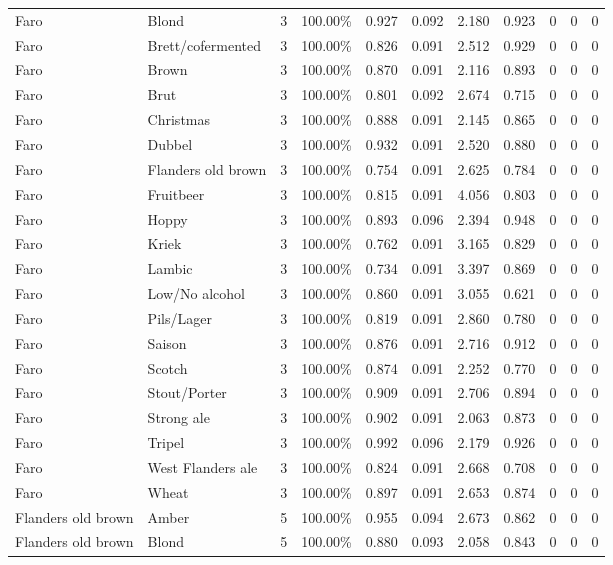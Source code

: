 {\begin{longtable}{llrrrrrrrrr}
Faro & Blond & 3 & 100.00\% & 0.927 & 0.092 & 2.180 & 0.923 & 0 & 0 & 0 \\
Faro & Brett/cofermented & 3 & 100.00\% & 0.826 & 0.091 & 2.512 & 0.929 & 0 & 0 & 0 \\
Faro & Brown & 3 & 100.00\% & 0.870 & 0.091 & 2.116 & 0.893 & 0 & 0 & 0 \\
Faro & Brut & 3 & 100.00\% & 0.801 & 0.092 & 2.674 & 0.715 & 0 & 0 & 0 \\
Faro & Christmas & 3 & 100.00\% & 0.888 & 0.091 & 2.145 & 0.865 & 0 & 0 & 0 \\
Faro & Dubbel & 3 & 100.00\% & 0.932 & 0.091 & 2.520 & 0.880 & 0 & 0 & 0 \\
Faro & Flanders old brown & 3 & 100.00\% & 0.754 & 0.091 & 2.625 & 0.784 & 0 & 0 & 0 \\
Faro & Fruitbeer & 3 & 100.00\% & 0.815 & 0.091 & 4.056 & 0.803 & 0 & 0 & 0 \\
Faro & Hoppy & 3 & 100.00\% & 0.893 & 0.096 & 2.394 & 0.948 & 0 & 0 & 0 \\
Faro & Kriek & 3 & 100.00\% & 0.762 & 0.091 & 3.165 & 0.829 & 0 & 0 & 0 \\
Faro & Lambic & 3 & 100.00\% & 0.734 & 0.091 & 3.397 & 0.869 & 0 & 0 & 0 \\
Faro & Low/No alcohol & 3 & 100.00\% & 0.860 & 0.091 & 3.055 & 0.621 & 0 & 0 & 0 \\
Faro & Pils/Lager & 3 & 100.00\% & 0.819 & 0.091 & 2.860 & 0.780 & 0 & 0 & 0 \\
Faro & Saison & 3 & 100.00\% & 0.876 & 0.091 & 2.716 & 0.912 & 0 & 0 & 0 \\
Faro & Scotch & 3 & 100.00\% & 0.874 & 0.091 & 2.252 & 0.770 & 0 & 0 & 0 \\
Faro & Stout/Porter & 3 & 100.00\% & 0.909 & 0.091 & 2.706 & 0.894 & 0 & 0 & 0 \\
Faro & Strong ale & 3 & 100.00\% & 0.902 & 0.091 & 2.063 & 0.873 & 0 & 0 & 0 \\
Faro & Tripel & 3 & 100.00\% & 0.992 & 0.096 & 2.179 & 0.926 & 0 & 0 & 0 \\
Faro & West Flanders ale & 3 & 100.00\% & 0.824 & 0.091 & 2.668 & 0.708 & 0 & 0 & 0 \\
Faro & Wheat & 3 & 100.00\% & 0.897 & 0.091 & 2.653 & 0.874 & 0 & 0 & 0 \\
Flanders old brown & Amber & 5 & 100.00\% & 0.955 & 0.094 & 2.673 & 0.862 & 0 & 0 & 0 \\
Flanders old brown & Blond & 5 & 100.00\% & 0.880 & 0.093 & 2.058 & 0.843 & 0 & 0 & 0 \\

\end{longtable}}
